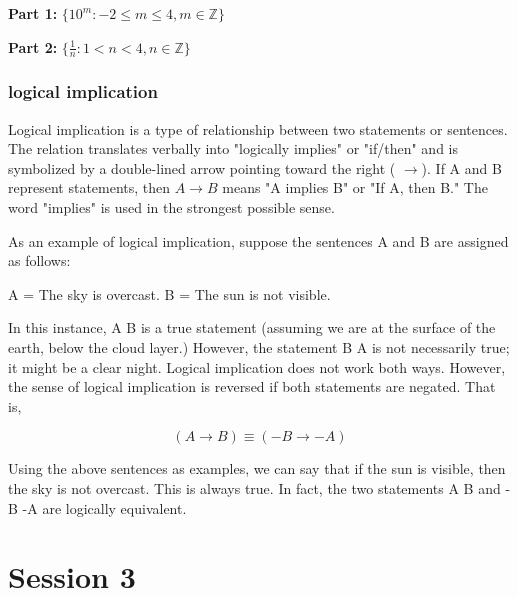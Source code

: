 \documentclass[]{report}
\begin{document}
\begin{enumerate}


\vspace{-4cm}
\textbf{Part 1:} $ \{ 10^m : -2 \leq m \leq 4, m \in \mathbb{Z} \} $




\vspace{-4cm}
\textbf{Part 2:} $ \{ \frac{1}{n}: 1 < n < 4, n \in \mathbb{Z} \} $

\subsection{logical implication}


Logical implication is a type of relationship between two statements or sentences. The relation translates verbally into "logically implies" or "if/then" and is symbolized by a double-lined arrow pointing toward the right ( $\rightarrow$). If A and B represent statements, then $A\rightarrow B$ means "A implies B" or "If A, then B." The word "implies" is used in the strongest possible sense.


As an example of logical implication, suppose the sentences A and B are assigned as follows:

A = The sky is overcast.
B = The sun is not visible.

In this instance, A B is a true statement (assuming we are at the surface of the earth, below the cloud layer.) However, the statement B A is not necessarily true; it might be a clear night. Logical implication does not work both ways. However, the sense of logical implication is reversed if both statements are negated. That is,

$$(A \rightarrow B)  \equiv (-B \rightarrow -A)$$

Using the above sentences as examples, we can say that if the sun is visible, then the sky is not overcast. This is always true. In fact, the two statements A B and -B -A are logically equivalent.

\newpage
\chapter{Session 3}

\end{enumerate}
\end{document}
